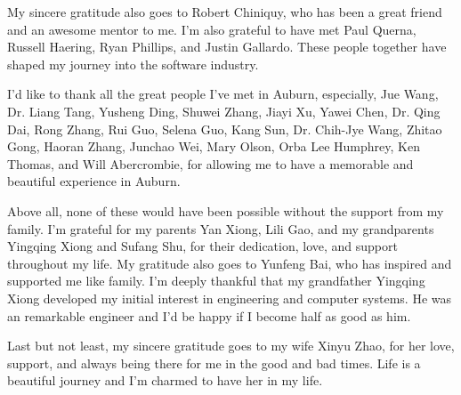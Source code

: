 \begin{acknowledgments}
  My sincere gratitude also goes to Robert Chiniquy, who has been a great friend and an awesome mentor to me. I'm also grateful to have met Paul Querna, Russell Haering, Ryan Phillips, and Justin Gallardo. These people together have shaped my journey into the software industry.

  I'd like to thank all the great people I've met in Auburn, especially, Jue Wang, Dr. Liang Tang, Yusheng Ding, Shuwei Zhang, Jiayi Xu, Yawei Chen, Dr. Qing Dai, Rong Zhang, Rui Guo, Selena Guo, Kang Sun, Dr. Chih-Jye Wang, Zhitao Gong, Haoran Zhang, Junchao Wei, Mary Olson, Orba Lee Humphrey, Ken Thomas, and Will Abercrombie, for allowing me to have a memorable and beautiful experience in Auburn.

  Above all, none of these would have been possible without the support from my family. I'm grateful for my parents Yan Xiong, Lili Gao, and my grandparents Yingqing Xiong and Sufang Shu, for their dedication, love, and support throughout my life. My gratitude also goes to Yunfeng Bai, who has inspired and supported me like family. I'm deeply thankful that my grandfather Yingqing Xiong developed my initial interest in engineering and computer systems. He was an remarkable engineer and I'd be happy if I become half as good as him.

  Last but not least, my sincere gratitude goes to my wife Xinyu Zhao, for her love, support, and always being there for me in the good and bad times. Life is a beautiful journey and I'm charmed to have her in my life. 

\end{acknowledgments}

